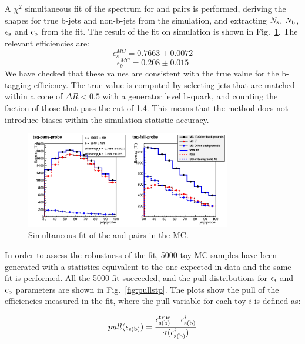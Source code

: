 A $\chi^{2}$ simultaneous fit of the \probe{} \pt spectrum for \tpp{} and \tfp{} pairs is performed, deriving the shapes for true b-jets and non-b-jets from the simulation, and extracting $N_{\rm s}$, $N_{\rm b}$, $\epsilon_{\rm s}$ and $\epsilon_{\rm b}$ from the fit.
The result of the fit on simulation is shown in Fig.~\ref{fig:mc_tp}. The relevant efficiencies are:
\begin{equation}
\epsilon_{s}^{MC}=0.7663\pm0.0072
\end{equation}
\begin{equation}
\epsilon_{b}^{MC}=0.208\pm0.015
\end{equation}
We have checked that these values are consistent with the true value for the b-tagging efficiency. The true value is computed by selecting jets that are matched within a cone of $\Delta{R}<0.5$ with a generator level b-quark, and counting the faction of those that pass the \jpb cut of 1.4. This means that the \tp{} method does not introduce biases within the simulation statistic accuracy.

\begin{figure}[b]
\centering
\includegraphics[width=0.8\textwidth]{images/mc_pt_probe.pdf}
\caption{Simultaneous fit of the \tpp{} and \tfp{} pairs in the MC.\label{fig:mc_tp}}
\end{figure}

In order to assess the robustness of the fit, 5000 toy MC samples have been generated with a statistics equivalent to the one expected in data and the same fit is performed. All the 5000 fit succeeded, and the pull distributions for $\epsilon_{\rm s}$ and $\epsilon_{\rm b}$ parameters are shown in Fig.~\ref{fig:pullstp}. The plots show the pull of the efficiencies measured in the fit, where the pull variable for each toy $i$ is defined as:

\begin{equation}
pull(\epsilon_{\rm s (b)}) = \frac{\epsilon_{\rm s (b)}^{\rm true} - \epsilon_{\rm s (b)}^{i}}{\sigma(\epsilon_{\rm s (b)}^{i})}
\end{equation}

